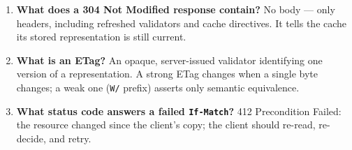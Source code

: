 \begin{enumerate}[label=\textbf{Q\arabic*.}, leftmargin=1.6cm]
        Caches must not store any part of the response; every request must
        reach the origin. It is the correct directive for credentials and
        personal data.
  \item \textbf{What does a 304 Not Modified response contain?}
        No body --- only headers, including refreshed validators and cache
        directives. It tells the cache its stored representation is still
        current.
  \item \textbf{What is an ETag?}
        An opaque, server-issued validator identifying one version of a
        representation. A strong ETag changes when a single byte changes;
        a weak one (\texttt{W/} prefix) asserts only semantic equivalence.
  \item \textbf{What status code answers a failed \texttt{If-Match}?}
        412 Precondition Failed: the resource changed since the client's
        copy; the client should re-read, re-decide, and retry.
\end{enumerate}

